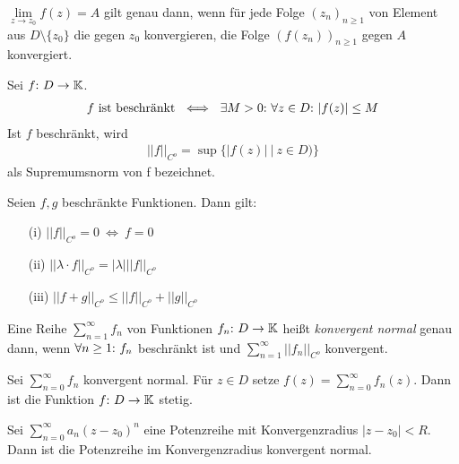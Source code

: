 \begin{framedthm}
	$\lim\limits_{z \to z_0} f(z) = A$ gilt genau dann, wenn für jede Folge $(z_n)_{n\geq 1}$ von Element aus $D\setminus\{z_0\}$ die gegen $z_0$ konvergieren, die Folge $(f(z_n))_{n\geq 1}$ gegen $A$ konvergiert.
\end{framedthm}

\begin{frameddefn}
	Sei $f{:}\  D \to \mathbb{K}$.
	\begin{align*}
		f \textrm{ ist beschränkt} \ \iff\ \exists M > 0{:}\  \forall z \in D{:}\  |f(z)| \leq M
	\end{align*}
	Ist $f$ beschränkt, wird
	\begin{align*}
		||f||_{C^o} = \sup\{|f(z)|\ \big|\ z \in D)\}
	\end{align*}
	als Supremumsnorm von f bezeichnet.
\end{frameddefn}

\begin{framedthm}
	Seien $f,g$ beschränkte Funktionen. Dann gilt:
	\begin{enumerate}
		\item[(i)] $||f||_{C^o} = 0 \ \iff\ f = 0$
		\item[(ii)] $||\lambda\cdot f||_{C^o} = |\lambda|||f||_{C^o}$
		\item[(iii)] $||f+g||_{C^o} \leq ||f||_{C^o} + ||g||_{C^o}$
	\end{enumerate}
\end{framedthm}

\begin{frameddefn}
	Eine Reihe $\sum_{n=1}^{\infty} f_n$ von Funktionen $f_n{:}\  D \to \mathbb{K}$ heißt \textit{konvergent normal} genau dann, wenn $\forall n \geq 1{:}\  f_n$ beschränkt ist und $\sum_{n=1}^{\infty}||f_n||_{C^o}$ konvergent.
\end{frameddefn}

\begin{framedthm}
	Sei $\sum_{n=0}^{\infty}f_n$ konvergent normal. Für $z \in D$ setze $f(z) = \sum_{n=0}^{\infty}f_n(z)$. Dann ist die Funktion $f{:}\  D \to \mathbb{K}$ stetig.
\end{framedthm}

\begin{framedquest}
	Sei $\sum_{n=0}^{\infty} a_n (z-z_0)^n$ eine Potenzreihe mit Konvergenzradius $|z-z_0| < R$. Dann ist die Potenzreihe im Konvergenzradius konvergent normal.
\end{framedquest}

